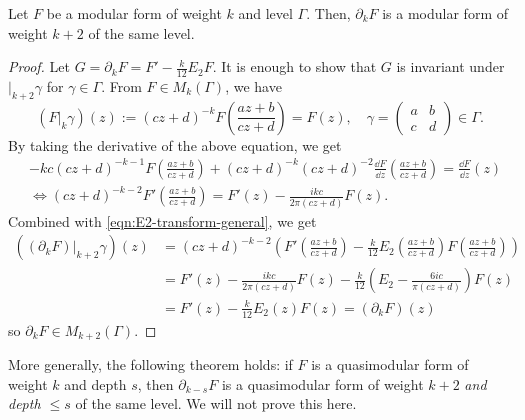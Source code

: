 \begin{theorem}\label{thm:serre-der-modularity}
Let $F$ be a modular form of weight $k$ and level $\Gamma$.
Then, $\partial_{k}F$ is a modular form of weight $k + 2$ of the same level.
\end{theorem}
\begin{proof}
Let $G = \partial_{k}F = F' - \frac{k}{12}E_2 F$.
It is enough to show that $G$ is invariant under $|_{k+2}\gamma$ for $\gamma \in \Gamma$.
From $F \in M_k(\Gamma)$, we have
\begin{equation}
    (F|_{k}\gamma)(z) := (cz + d)^{-k} F\left(\frac{az + b}{cz + d}\right) = F(z), \quad \gamma = \begin{pmatrix}a & b \\ c & d\end{pmatrix} \in \Gamma.
\end{equation}
By taking the derivative of the above equation, we get
\begin{align}
    &-kc (cz + d)^{-k - 1} F\left(\frac{az + b}{cz + d}\right) + (cz + d)^{-k} (cz + d)^{-2} \frac{\dd F}{\dd z}\left(\frac{az + b}{cz + d}\right) = \frac{\dd F}{\dd z}(z) \\
    &\Leftrightarrow (cz + d)^{-k - 2} F'\left(\frac{az + b}{cz + d}\right) = F'(z) - \frac{ikc}{2\pi(cz + d)}F(z).
\end{align}
Combined with \eqref{eqn:E2-transform-general}, we get
\begin{align}
    ((\partial_k F)|_{k+2}\gamma)(z) &= (cz + d)^{-k-2} \left(F'\left(\frac{az + b}{cz + d}\right) - \frac{k}{12}E_2\left(\frac{az + b}{cz + d}\right)F\left(\frac{az + b}{cz + d}\right)\right) \\
    &= F'(z) - \frac{ikc}{2 \pi(cz + d)} F(z) - \frac{k}{12} \left(E_2 - \frac{6ic}{\pi(cz + d)}\right) F(z) \\
    &= F'(z) - \frac{k}{12} E_2(z) F(z) = (\partial_{k} F)(z)
\end{align}
so $\partial_{k}F \in M_{k+2}(\Gamma)$.
\end{proof}
\begin{remark}
More generally, the following theorem holds: if $F$ is a quasimodular form of weight $k$ and depth $s$, then $\partial_{k-s}F$ is a quasimodular form of weight $k + 2$ \emph{and depth $\le s$} of the same level. We will not prove this here.
\end{remark}

